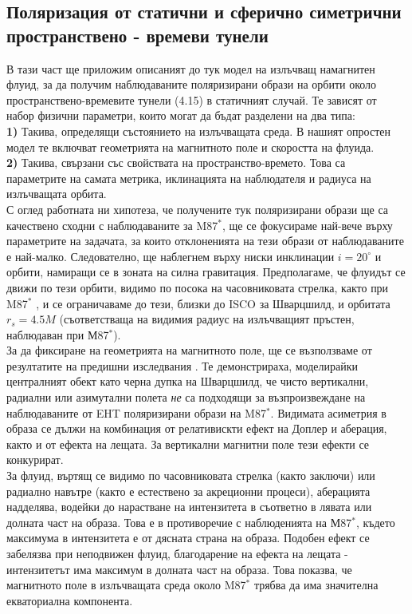 \subsection{Поляризация от статични и сферично симетрични пространствено - времеви тунели}
В тази част ще приложим описаният до тук модел на излъчващ намагнитен флуид, за да получим наблюдаваните поляризирани образи на орбити около пространствено-времевите тунели (4.15) в статичният случай. Те зависят от набор физични параметри, които могат да бъдат разделени на два типа:\\

\textbf{1)} Такива, определящи състоянието на излъчващата среда. В нашият опростен модел те включват геометрията на магнитното поле и скоростта на флуида.\\

\textbf{2)} Такива, свързани със свойствата на пространство-времето. Това са параметрите на самата метрика, иклинацията на наблюдателя и радиуса на излъчващата орбита.\\

С оглед работната ни хипотеза, че получените тук поляризирани образи ще са качествено сходни с наблюдаваните за M87$^*$, ще се фокусираме най-вече върху параметрите на задачата, за които отклоненията на тези образи от наблюдаваните е най-малко. Следователно, ще наблегнем върху ниски инклинации $i = 20^\circ$ и орбити, намиращи се в зоната на силна гравитация. Предполагаме, че флуидът се движи по тези орбити, видимо по посока на часовниковата стрелка, както при M87$^*$ \cite{EHT_M87_V}, и се ограничаваме до тези, близки до ISCO за Шварцшилд, и орбитата $r_s = 4.5M$ (съответстваща на видимия радиус на излъчващият пръстен, наблюдаван при М87$^*$). \\

За да фиксиране на геометрията на магнитното поле, ще се възползваме от резултатите на предишни изследвания \cite{Narayan2021}. Те демонстрираха, моделирайки централният обект като черна дупка на Шварцшилд, че чисто вертикални, радиални или азимутални полета \emph{не} са подходящи за възпроизвеждане на наблюдаваните от EHT поляризирани образи на M87$^*$. Видимата асиметрия в образа се дължи на комбинация от релативискти ефект на Доплер и аберация, както и от ефекта на лещата. За вертикални магнитни поле тези ефекти се конкурират.\\

За флуид, въртящ се видимо по часовниковата стрелка (както \cite{EHT_M87_V} заключи) или радиално навътре (както е естествено за акреционни процеси), аберацията надделява, водейки до нарастване на интензитета в съответно в лявата или долната част на образа. Това е в противоречие с наблюденията на М87$^*$, където максимума в интензитета е от дясната страна на образа. Подобен ефект се забелязва при неподвижен флуид, благодарение на ефекта на лещата - интензитетът има максимум в долната част на образа. Това показва, че магнитното поле в излъчващата среда около M87$^*$ трябва да има значителна екваториална компонента. \\

